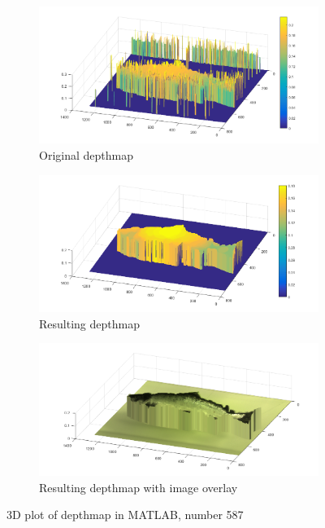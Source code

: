 \begin{figure}[H]
    \centering
    \begin{subfigure}{1\textwidth}
        \centering
        \includegraphics[width=.85\linewidth]{images/results/3D_plots/original_3D_87}
        \caption{Original depthmap} 
        \label{fig:3D_original_87}
    \end{subfigure}\hspace*{\fill}
    
    \medskip
    \begin{subfigure}{1\textwidth}
        \centering
        \includegraphics[width=.85\linewidth]{images/results/3D_plots/fixed_3D_87}
        \caption{Resulting depthmap} 
        \label{fig:3D_fixed_87}
    \end{subfigure}\hspace*{\fill}
    
    \medskip
    \begin{subfigure}{1\textwidth}
        \centering
        \includegraphics[width=.85\linewidth]{images/results/3D_plots/fixed_3D_fish_87}
        \caption{Resulting depthmap with image overlay} 
        \label{fig:3D_fixed_fish_87}
    \end{subfigure}\hspace*{\fill}
    \caption{3D plot of depthmap in MATLAB, number 587}
    \label{fig:3D_plot_87}
\end{figure}




